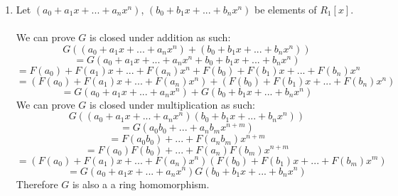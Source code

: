 \documentclass{article}
\begin{document}
\begin{enumerate}
\item Let $(a_0 + a_{1}x + ... + a_{n}x^n)$, $(b_0 + b_{1}x + ... + b_{n}x^n)$
be elements of $R_{1}[x]$.
\\
\\
We can prove $G$ is closed under addition as such:
\[
G((a_0 + a_{1}x + ... + a_{n}x^{n}) + (b_0 + b_{1}x + ... + b_{n}x^{n}))
\] \[
= G(a_0 + a_{1}x + ... + a_{n}x^n + b_0 + b_{1}x + ... + b_{n}x^{n})
\] \[
= F(a_{0}) + F(a_{1})x + ... + F(a_{n})x^{n} + F(b_{0}) + F(b_{1})x + ... + F(b_{n})x^{n}
\] \[
= (F(a_{0}) + F(a_{1})x + ... + F(a_{n})x^{n}) + (F(b_{0}) + F(b_{1})x + ... + F(b_{n})x^{n})
\] \[
= G(a_0 + a_{1}x + ... + a_{n}x^{n}) + G(b_0 + b_{1}x + ... + b_{n}x^{n})
\]
We can prove $G$ is closed under multiplication as such:
\[
G((a_0 + a_{1}x + ... + a_{n}x^{n}) (b_0 + b_{1}x + ... + b_{n}x^{n}))
\] \[
= G (a_{0}b_{0} + ... + a_{n}b_{m}x^{n+m})
\] \[
= F(a_{0}b_{0}) + ... + F(a_{n}b_{m})x^{n+m}
\] \[
= F(a_{0})F(b_{0}) + ... + F(a_{n})F(b_{m})x^{n+m}
\] \[
= (F(a_{0}) + F(a_{1})x + ... + F(a_{n})x^{n})(F(b_{0}) + F(b_{1})x + ... + F(b_{m})x^{m})
\] \[
= G(a_0 + a_{1}x + ... + a_{n}x^{n}) G(b_0 + b_{1}x + ... + b_{n}x^{n})
\]
Therefore $G$ is also a a ring homomorphism.

\end{enumerate}
\end{document}
